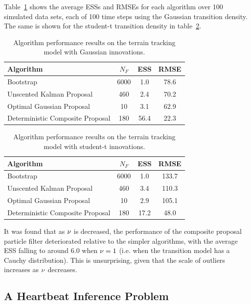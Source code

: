\documentclass{article}
\begin{document}
Table~\ref{tab:drone_results_gaussian} shows the average ESSs and RMSEs for each algorithm over 100 simulated data sets, each of 100 time steps using the Gaussian transition density. The same is shown for the student-t transition density in table~\ref{tab:drone_results_studentt}.
%
\begin{table}
\centering
\begin{tabular}{l||c|c|c}
Algorithm                                & $N_F$ & ESS  & RMSE \\
\hline
Bootstrap                                &  6000 &  1.0 & 78.6 \\
Unscented Kalman Proposal                &   460 &  2.4 & 70.2 \\
Optimal Gaussian Proposal                &    10 &  3.1 & 62.9 \\
Deterministic Composite Proposal         &   180 & 56.4 & 22.3 \\
\end{tabular}
\caption{Algorithm performance results on the terrain tracking model with Gaussian innovations.}
\label{tab:drone_results_gaussian}
\end{table}
%
\begin{table}
\centering
\begin{tabular}{l||c|c|c}
Algorithm                                & $N_F$ & ESS  & RMSE \\
\hline
Bootstrap                                &  6000 &  1.0 & 133.7 \\
Unscented Kalman Proposal                &   460 &  3.4 & 110.3 \\
Optimal Gaussian Proposal                &    10 &  2.9 & 105.1 \\
Deterministic Composite Proposal         &   180 & 17.2 & 48.0 \\
\end{tabular}
\caption{Algorithm performance results on the terrain tracking model with student-t innovations.}
\label{tab:drone_results_studentt}
\end{table}

It was found that as $\nu$ is decreased, the performance of the composite proposal particle filter deteriorated relative to the simpler algorithms, with the average ESS falling to around $6.0$ when $\nu=1$ (i.e. when the transition model has a Cauchy distribution). This is unsurprising, given that the scale of outliers increases as $\nu$ decreases.



\subsection{A Heartbeat Inference Problem}
\end{document}
